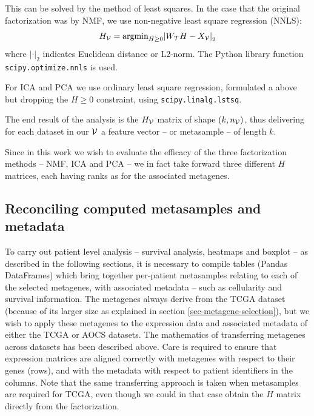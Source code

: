 \documentclass[draft,tikz, 12pt,a4paper,oneside,fleqn]{article}
\begin{document}
This can be solved by the method of least squares.  In the case that the original factorization was by NMF, we use non-negative least square regression (NNLS):
\begin{equation}
	H_{\mathcal{V}} = \mbox{argmin}_{H\geq 0}{\lvert W_{\mathcal{T}} H - X_{\mathcal{V}} \rvert}_2
	\label{eq_Hv_WdtXv}
\end{equation}
where ${\lvert \mathbf{\cdot} \rvert}_2$ indicates Euclidean distance or L2-norm.
The Python library function {\tt scipy.optimize.nnls} is used.

For ICA and PCA we use ordinary least square regression, formulated a above but dropping the $H\geq 0$ constraint, using {\tt scipy.linalg.lstsq}.


The end result of the analysis is the $H_{\mathcal{V}}$ matrix of shape $(k, n_{\mathcal{V}})$, thus delivering for each dataset in our $\mathcal{V}$ a feature vector -- or metasample -- of length $k$. 

Since in this work we wish to evaluate the efficacy of the three factorization methods -- NMF, ICA and PCA -- we in fact take forward three different $H$ matrices, each having ranks as for the associated metagenes.

\subsection{Reconciling computed metasamples and metadata}
\label{sec-reconciling-metasamples-metadata}

To carry out patient level analysis -- survival analysis, heatmaps and boxplot -- as described in the following sections, it is necessary to compile tables (Pandas DataFrames) which bring together per-patient metasamples relating to each of the selected metagenes, with associated metadata -- such as cellularity and survival information.   The metagenes always derive from the TCGA dataset (because of its larger size as explained in section \ref{sec-metagene-selection}), but we wish to apply these metagenes to the expression data and associated metadata of either the TCGA or AOCS datasets.   
The mathematics of transferring metagenes across datasets has been described above.  Care is required to ensure that expression matrices are aligned correctly with metagenes with respect to their genes (rows), and with the metadata with respect to patient identifiers in the columns.
Note that the same transferring approach is taken when metasamples are required for TCGA, even though we could in that case obtain the $H$ matrix directly from the factorization.
\end{document}
